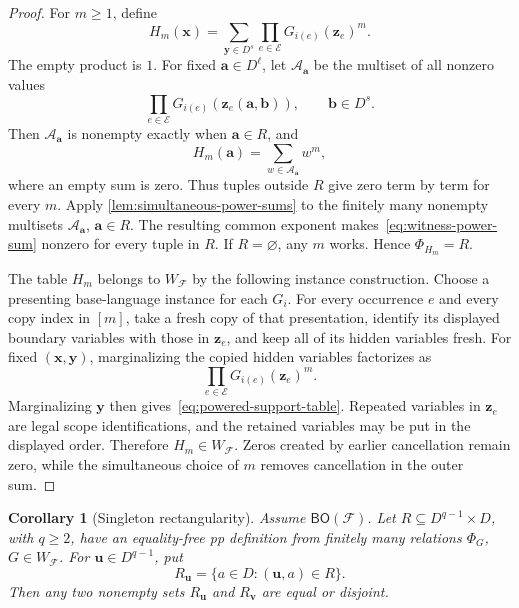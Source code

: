 \documentclass[11pt]{article}
\theoremstyle{plain}
\newtheorem{corollary}[corollary]{Corollary}
\theoremstyle{definition}
\theoremstyle{remark}
\newcommand{\cF}{\mathcal F}
\newcommand{\BO}{\mathsf{BO}}
\newcommand{\SuppRel}[1]{\Phi_{#1}}
\begin{document}
\begin{proof}
For $m\ge1$, define
\begin{equation}
  H_m(\mathbf x)
  =\sum_{\mathbf y\in D^s}
       \prod_{e\in\mathcal E}G_{i(e)}(\mathbf z_e)^m.
  \label{eq:powered-support-table}
\end{equation}
The empty product is $1$.  For fixed $\mathbf a\in D^\ell$, let
$\mathcal A_{\mathbf a}$ be the multiset of all nonzero values
\[
  \prod_{e\in\mathcal E}
      G_{i(e)}(\mathbf z_e(\mathbf a,\mathbf b)),
  \qquad \mathbf b\in D^s.
\]
Then $\mathcal A_{\mathbf a}$ is nonempty exactly when $\mathbf a\in R$,
and
\begin{equation}
  H_m(\mathbf a)=\sum_{w\in\mathcal A_{\mathbf a}}w^m,
  \label{eq:witness-power-sum}
\end{equation}
where an empty sum is zero.  Thus tuples outside $R$ give zero term by term
for every $m$.  Apply \cref{lem:simultaneous-power-sums} to the finitely many
nonempty multisets $\mathcal A_{\mathbf a}$, $\mathbf a\in R$.  The resulting
common exponent makes~\eqref{eq:witness-power-sum} nonzero for every tuple in
$R$.  If $R=\varnothing$, any $m$ works.  Hence $\SuppRel{H_m}=R$.

The table $H_m$ belongs to $W_{\cF}$ by the following instance construction.
Choose a presenting base-language instance for each $G_i$.  For every
occurrence $e$ and every
copy index in $[m]$, take a fresh copy of that presentation, identify its
displayed boundary variables with those in $\mathbf z_e$, and keep all of
its hidden variables fresh.  For fixed $(\mathbf x,\mathbf y)$,
marginalizing the copied hidden variables factorizes as
\[
  \prod_{e\in\mathcal E}G_{i(e)}(\mathbf z_e)^m.
\]
Marginalizing $\mathbf y$ then gives~\eqref{eq:powered-support-table}.
Repeated variables in $\mathbf z_e$ are legal scope identifications, and the
retained variables may be put in the displayed order.  Therefore
$H_m\in W_{\cF}$.  Zeros created by earlier cancellation remain zero, while
the simultaneous choice of $m$ removes cancellation in the outer sum.
\end{proof}

\begin{corollary}[Singleton rectangularity]
\label{cor:generated-singleton-rectangularity}
Assume $\BO(\cF)$.  Let $R\subseteq D^{q-1}\times D$, with $q\ge2$, have an
equality-free pp definition from finitely many relations $\SuppRel G$,
$G\in W_{\cF}$.  For $\mathbf u\in D^{q-1}$, put
\[
  R_{\mathbf u}=\{a\in D:(\mathbf u,a)\in R\}.
\]
Then any two nonempty sets $R_{\mathbf u}$ and $R_{\mathbf v}$ are equal or
disjoint.
\end{corollary}
\end{document}
